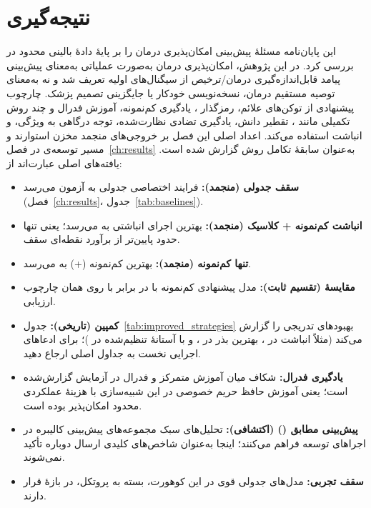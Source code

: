 \chapter{نتیجه‌گیری}
\label{ch:conclusion}

این پایان‌نامه مسئلۀ پیش‌بینی امکان‌پذیری درمان را بر پایۀ دادۀ بالینی محدود در  بررسی کرد. در این پژوهش، امکان‌پذیری درمان به‌صورت عملیاتی به‌معنای پیش‌بینی پیامد قابل‌اندازه‌گیری درمان/ترخیص از سیگنال‌های اولیه  تعریف شد و نه به‌معنای توصیه مستقیم درمان، نسخه‌نویسی خودکار یا جایگزینی تصمیم پزشک. چارچوب پیشنهادی از توکن‌های علائم، رمزگذار ، یادگیری کم‌نمونه، آموزش فدرال و چند روش تکمیلی مانند ، تقطیر دانش، یادگیری تضادی نظارت‌شده، توجه درگاهی به ویژگی،  و انباشت استفاده می‌کند. اعداد اصلی این فصل بر خروجی‌های منجمد مخزن استوارند و مسیر توسعه‌ی  در فصل~\ref{ch:results} به‌عنوان سابقۀ تکامل روش گزارش شده است. یافته‌های اصلی عبارت‌اند از:

\begin{itemize}
\item \textbf{سقف جدولی (منجمد):} فرایند اختصاصی جدولی به  آزمون \textbf{} می‌رسد (فصل~\ref{ch:results}، جدول~\ref{tab:baselines}).
\item \textbf{انباشت کم‌نمونه + کلاسیک (منجمد):} بهترین اجرای انباشتی به  \textbf{} \cnum{[0.699, 0.797]} می‌رسد؛ یعنی تنها حدود \textbf{} پایین‌تر از برآورد نقطه‌ای سقف.
\item \textbf{تنها کم‌نمونه (منجمد):} بهترین کم‌نمونه (+) به  \textbf{} \cnum{[0.612, 0.726]} می‌رسد.
\item \textbf{مقایسۀ  (تقسیم ثابت):} مدل پیشنهادی کم‌نمونه با \textbf{} در برابر  با \textbf{} روی همان چارچوب ارزیابی.
\item \textbf{کمپین  (تاریخی):} جدول~\ref{tab:improved_strategies} بهبودهای تدریجی را گزارش می‌کند (مثلاً انباشت  در ، بهترین بذر  در ، و  با آستانۀ تنظیم‌شده در )؛ برای ادعاهای اجرایی نخست به جداول اصلی ارجاع دهید.
\item \textbf{یادگیری فدرال:} شکاف  میان آموزش متمرکز و فدرال در آزمایش گزارش‌شده \textbf{} است؛ یعنی آموزش حافظ حریم خصوصی در این شبیه‌سازی با هزینۀ عملکردی محدود امکان‌پذیر بوده است.
\item \textbf{پیش‌بینی مطابق () (اکتشافی):} تحلیل‌های سبک  مجموعه‌های پیش‌بینی کالیبره در اجراهای توسعه فراهم می‌کنند؛ اینجا به‌عنوان شاخص‌های کلیدی ارسال دوباره تأکید نمی‌شوند.
\item \textbf{سقف تجربی:} مدل‌های جدولی قوی در این کوهورت، بسته به پروتکل، در بازۀ \textbf{} قرار دارند.
\end{itemize}

